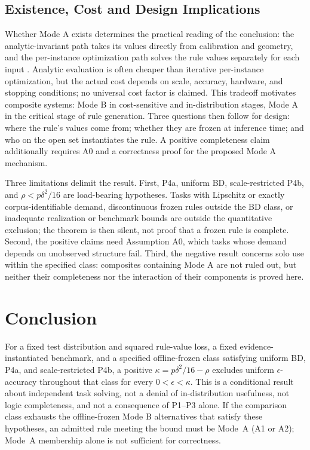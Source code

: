 \documentclass[twoside,11pt]{article}
\begin{document}
\subsection{Existence, Cost and Design Implications}
\label{sec:cost}%

Whether Mode A exists determines the practical reading of the conclusion: the analytic-invariant path takes its values directly from calibration and geometry, and the per-instance optimization path solves the rule values separately for each input \citep{sun2020}. Analytic evaluation is often cheaper than iterative per-instance optimization, but the actual cost depends on scale, accuracy, hardware, and stopping conditions; no universal cost factor is claimed. This tradeoff motivates composite systems: Mode B in cost-sensitive and in-distribution stages, Mode A in the critical stage of rule generation. Three questions then follow for design: where the rule's values come from; whether they are frozen at inference time; and who on the open set instantiates the rule. A positive completeness claim additionally requires A0 and a correctness proof for the proposed Mode A mechanism.

Three limitations delimit the result. First, P4a, uniform BD, scale-restricted P4b, and $\rho<p\delta^2/16$ are load-bearing hypotheses. Tasks with Lipschitz or exactly corpus-identifiable demand, discontinuous frozen rules outside the BD class, or inadequate realization or benchmark bounds are outside the quantitative exclusion; the theorem is then silent, not proof that a frozen rule is complete. Second, the positive claims need Assumption A0, which tasks whose demand depends on unobserved structure fail. Third, the negative result concerns solo use within the specified class: composites containing Mode A are not ruled out, but neither their completeness nor the interaction of their components is proved here.

\section{Conclusion}
\label{ch:conclusion}%

For a fixed test distribution and squared rule-value loss, a fixed evidence-instantiated benchmark, and a specified offline-frozen class satisfying uniform BD, P4a, and scale-restricted P4b, a positive $\kappa=p\delta^2/16-\rho$ excludes uniform $\epsilon$-accuracy throughout that class for every $0<\epsilon<\kappa$. This is a conditional result about independent task solving, not a denial of in-distribution usefulness, not logic completeness, and not a consequence of P1--P3 alone. If the comparison class exhausts the offline-frozen Mode B alternatives that satisfy these hypotheses, an admitted rule meeting the bound must be Mode~A (A1 or A2); Mode~A membership alone is not sufficient for correctness.
\end{document}
